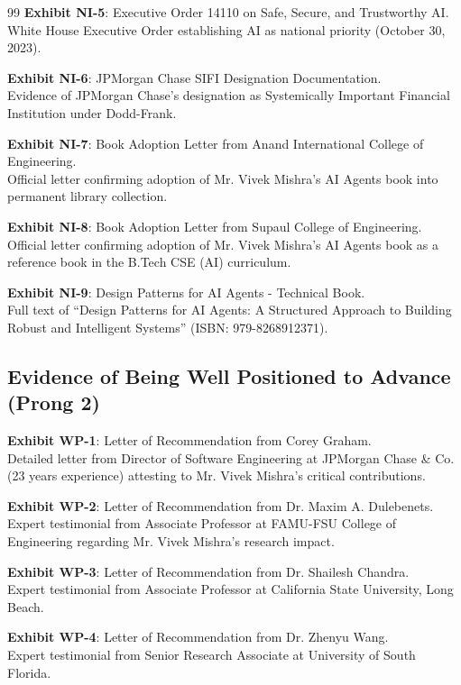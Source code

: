 \documentclass[11pt]{article}
\newcommand{\drs}{Mr. Vivek Mishra's }
\begin{document}
\begin{thebibliography}{99}
\textbf{Exhibit NI-5}: Executive Order 14110 on Safe, Secure, and Trustworthy AI.\\
White House Executive Order establishing AI as national priority (October 30, 2023).

\textbf{Exhibit NI-6}: JPMorgan Chase SIFI Designation Documentation.\\
Evidence of JPMorgan Chase's designation as Systemically Important Financial Institution under Dodd-Frank.

\textbf{Exhibit NI-7}: Book Adoption Letter from Anand International College of Engineering.\\
Official letter confirming adoption of \drs AI Agents book into permanent library collection.

\textbf{Exhibit NI-8}: Book Adoption Letter from Supaul College of Engineering.\\
Official letter confirming adoption of \drs AI Agents book as a reference book in the B.Tech CSE (AI) curriculum.

\textbf{Exhibit NI-9}: Design Patterns for AI Agents - Technical Book.\\
Full text of ``Design Patterns for AI Agents: A Structured Approach to Building Robust and Intelligent Systems'' (ISBN: 979-8268912371).

\subsection*{Evidence of Being Well Positioned to Advance (Prong 2)}

\textbf{Exhibit WP-1}: Letter of Recommendation from Corey Graham.\\
Detailed letter from Director of Software Engineering at JPMorgan Chase \& Co. (23 years experience) attesting to \drs critical contributions.

\textbf{Exhibit WP-2}: Letter of Recommendation from Dr. Maxim A. Dulebenets.\\
Expert testimonial from Associate Professor at FAMU-FSU College of Engineering regarding \drs research impact.

\textbf{Exhibit WP-3}: Letter of Recommendation from Dr. Shailesh Chandra.\\
Expert testimonial from Associate Professor at California State University, Long Beach.

\textbf{Exhibit WP-4}: Letter of Recommendation from Dr. Zhenyu Wang.\\
Expert testimonial from Senior Research Associate at University of South Florida.


\end{thebibliography}
\end{document}

